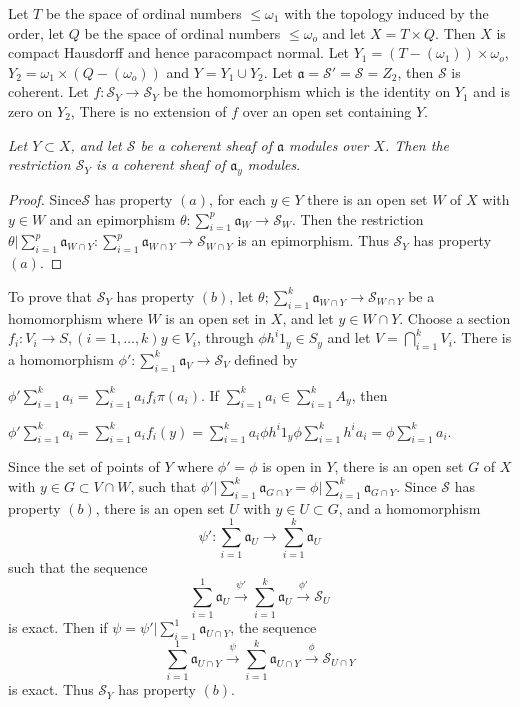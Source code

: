 \begin{exam}%
Let $T$ be the space of ordinal numbers $\le \omega_1$ with the
topology induced by the order, let $Q$ be the space of ordinal numbers
$\le \omega_o$ and let $X = T \times Q$. Then $X$ is compact Hausdorff
and hence paracompact normal. Let $Y_1 = (T-(\omega_1)) \times \omega_o$,
$Y_2 = \omega_1 \times (Q - (\omega_o))$ and $Y = Y_1 \cup Y_2$. Let
$\mathfrak{a} = \mathscr{S'} = \mathscr{S} = Z_2$, then $\mathscr{S}$ is
coherent. Let $f : \mathscr{S}_Y \rightarrow \mathscr{S}_Y$ be the
homomorphism which is the identity on $Y_1$ and is zero on $Y_2$,
There is no extension of $f$ over an open set containing $Y$. 
\end{exam}

\textit{Let $Y \subset X$, and let $\mathscr{S}$ be a coherent sheaf 
  of $\mathfrak{a}$ modules over $X$. Then the restriction
  $\mathscr{S}_Y$ is a coherent sheaf of $\mathfrak{a}_y$ modules}.  

\begin{proof}
Since\pageoriginale $\mathscr{S}$ has property $(a)$, for each $y \in
Y$ there is an 
open set $W$ of $X$ with $y \in W$ and an epimorphism $\theta :
\sum^{p}_{i=1} \mathfrak{a}_W\rightarrow \mathscr{S}_W$. Then the restriction
$\theta \Big| \sum^{p}_{i=1} \mathfrak{a}_{W \cap Y} :  \sum^{p}_{i=1}
\mathfrak{a}_{W \cap Y} \rightarrow \mathscr{S}_{W \cap Y}$ is an
epimorphism. Thus $\mathscr{S}_Y$ has property  $(a)$.  
\end{proof}

To prove that $ \mathscr{S}_Y$ has property $(b)$, let $\theta ;
\sum^k_{i=1} \mathfrak{a}_{W \cap Y} \rightarrow \mathscr{S}_{W \cap Y}$ be a
homomorphism where $W$ is an open set in $X$, and let $y \in W \cap
Y$. Choose a section $f_i : V_i \rightarrow S, (i = 1, \ldots , k) y
\in V_i$, through $\phi h^i 1_y \in S_y$ and let $V = \bigcap^k_{i=1}
V_i$. There is a homomorphism $\phi' : \sum^k_{i=1} \mathfrak{a}_V
\rightarrow \mathscr{S}_V$ defined by 

\noindent
$\phi' \sum^k_{i=1} a_i = \sum^k_{i=1} a_i f_i \pi (a_i)$. If
$\sum^k_{i=1} a_i \in \sum^k_{i=1} A_y$, then  

\noindent
$\phi' \sum^k_{i=1} a_i = \sum^k_{i=1} a_i f_i (y) =
\sum^k_{i=1} a_i \phi h^i 1_y \phi \sum^k_{i=1} h^i a_i = \phi
\sum^k_{i=1} a_i$.  

 Since the set of points of $Y$ where $\phi' = \phi$ is open in $Y$, there
is an open set $G$ of $X$ with $y \in G \subset V \cap W$, such that
$\phi' \Big| \sum^k_{i=1} \mathfrak{a}_{G \cap Y} = \phi \Big|
\sum^k_{i=1} \mathfrak{a}_{G \cap  Y}$. Since $\mathscr{S}$ has
property $(b)$, there is an open set 
$U$ with $y \in U \subset G$, and a homomorphism 
$$
\psi' : \sum^1_{i=1} \mathfrak{a}_U \rightarrow \sum^k_{i=1}
\mathfrak{a}_U 
$$
such that the sequence 
$$
\sum^1_{i=1} \mathfrak{a}_U \xrightarrow{\psi'} \sum^k_{i=1} \mathfrak{a}_U
\xrightarrow{\phi'} \mathscr{S}_U 
$$
is exact. Then if $\psi = \psi' \Big| \sum^1_{i=1} \mathfrak{a}_{U
  \cap Y}$, the sequence 
$$
\sum^1_{i=1} \mathfrak{a}_{U \cap Y} \xrightarrow{\psi}
\sum^k_{i=1} \mathfrak{a}_{U \cap Y} \xrightarrow{\phi}
\mathscr{S}_{U\cap Y} 
$$
is exact. Thus $\mathscr{S}_Y$ has property $(b)$.

